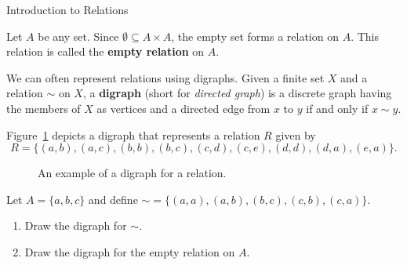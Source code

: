 \begin{section}{Introduction to Relations}
\begin{example}
Let $A$ be any set.  Since $\emptyset \subseteq A\times A$, the empty set forms a relation on $A$. This relation is called the \textbf{empty relation} on $A$.
\end{example}

We can often represent relations using digraphs.  Given a finite set $X$ and a relation $\sim$ on $X$, a \textbf{digraph} (short for \emph{directed graph}) is a discrete graph having the members of $X$ as vertices and a directed edge from $x$ to $y$ if and only if $x\sim y$.

\begin{example}
Figure~\ref{fig:digraph} depicts a digraph that represents a relation $R$ given by
\[
R=\{(a,b),(a,c),(b,b),(b,c),(c,d),(c,e),(d,d),(d,a),(e,a)\}.
\]

\begin{figure}[h!]
\begin{center}
\caption{An example of a digraph for a relation.}\label{fig:digraph}
\end{center}
\end{figure}

\end{example}

\begin{exercise}
Let $A=\{a,b,c\}$ and define ${\sim}=\{(a,a),(a,b),(b,c),(c,b),(c,a)\}$.  
\begin{enumerate}[label=\textrm{(\alph*)}]
\item Draw the digraph for $\sim$.
\item Draw the digraph for the empty relation on $A$.
\end{enumerate}
\end{exercise}


\end{section}
